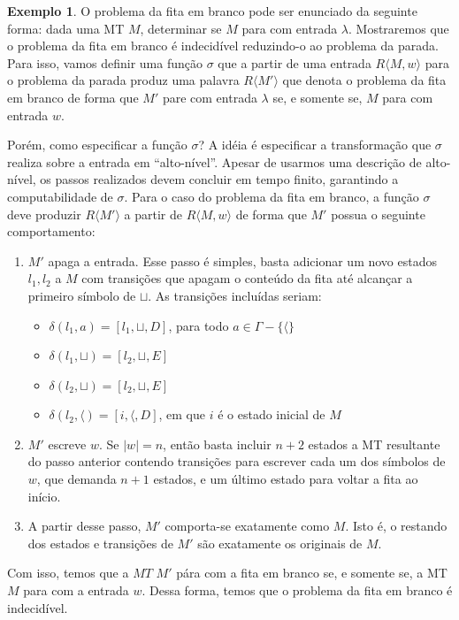 \documentclass[a4paper]{article}
\theoremstyle{definition}
\newtheorem{Example}{Exemplo}
\begin{document}
  \begin{Example}
    O problema da fita em branco pode ser enunciado da seguinte forma: dada uma
    MT $M$, determinar se $M$ para com entrada $\lambda$. Mostraremos que o
    problema da fita em branco é indecidível reduzindo-o ao problema da parada.
    Para isso, vamos definir uma função $\sigma$ que a partir de uma entrada
    $R\langle M,w \rangle$ para o problema da parada produz uma palavra
    $R\langle M' \rangle$ que denota o problema da fita em branco de forma que
    $M'$ pare com entrada $\lambda$ se, e somente se, $M$ para com entrada $w$.

    Porém, como especificar a função $\sigma$? A idéia é especificar a
    transformação que $\sigma$ realiza sobre a entrada em ``alto-nível''.
    Apesar de usarmos uma descrição de alto-nível, os passos realizados devem
    concluir em tempo finito, garantindo a computabilidade de $\sigma$.
    Para o caso do problema da fita em branco, a função $\sigma$ deve produzir
    $R\langle M' \rangle$ a partir de $R\langle M,w \rangle$ de forma que
    $M'$ possua o seguinte comportamento:
    \begin{enumerate}
      \item $M'$ apaga a entrada. Esse passo é simples, basta adicionar um novo
        estados $l_1,l_2$ a $M$ com transições que apagam o conteúdo da fita até
        alcançar a primeiro símbolo de $\sqcup$. As transições incluídas seriam:
        \begin{itemize}
          \item $\delta(l_1,a) = [l_1,\sqcup,D]$, para todo $a \in \Gamma
            -\{\langle\}$
          \item $\delta(l_1,\sqcup) = [l_2,\sqcup,E]$
          \item $\delta(l_2, \sqcup) = [l_2,\sqcup,E]$
          \item $\delta(l_2,\langle) = [i,\langle, D]$, em que $i$ é o estado
            inicial de $M$
          \end{itemize}
       \item $M'$ escreve $w$. Se $|w| = n$, então basta incluir $n + 2$ estados
         a MT resultante do passo anterior contendo transições para escrever cada
         um dos símbolos de $w$, que demanda $n + 1$ estados, e um último estado
         para voltar a fita ao início.
       \item A partir desse passo, $M'$ comporta-se exatamente como $M$. Isto é,
         o restando dos estados e transições de $M'$ são exatamente os originais
         de $M$.
    \end{enumerate}
    Com isso, temos que a $MT$ $M'$ pára com a fita em branco se, e somente se,
    a MT $M$ para com a entrada $w$. Dessa forma, temos que o problema da fita
    em branco é indecidível. 
  \end{Example}
\end{document}
